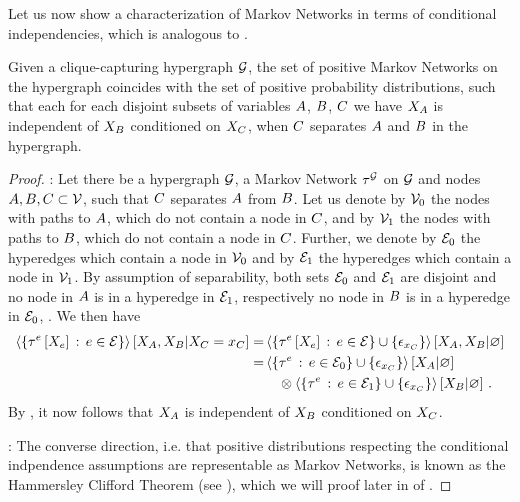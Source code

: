 Let us now show a characterization of Markov Networks in terms of conditional independencies, which is analogous to .

\begin{theorem}
    \label{the:condIndMN}
    Given a clique-capturing hypergraph $\mathcal{G}$, the set of positive Markov Networks on the hypergraph coincides with the set of positive probability distributions, such that each for each disjoint subsets of variables $A$, $B$, $C$ we have $X_{A}$ is independent of $X_{B}$ conditioned on $X_{C}$, when $C$ separates $A$ and $B$ in the hypergraph. %
\end{theorem}
\begin{proof}
    \proofrightsymbol:
    Let there be a hypergraph $\mathcal{G}$, a Markov Network $\tau^{\mathcal{G}}$ on $\mathcal{G}$ and nodes $A,B,C \subset \mathcal{V}$, such that $C$ separates $A$ from $B$.
    Let us denote by $\mathcal{V}_0$ the nodes with paths to $A$, which do not contain a node in $C$, and by $\mathcal{V}_1$ the nodes with paths to $B$, which do not contain a node in $C$.
    Further, we denote by $\mathcal{E}_0$ the hyperedges which contain a node in $\mathcal{V}_0$ and by $\mathcal{E}_1$ the hyperedges which contain a node in $\mathcal{V}_1$.
    By assumption of separability, both sets $\mathcal{E}_0$ and $\mathcal{E}_1$ are disjoint and no node in $A$ is in a hyperedge in $\mathcal{E}_1$, respectively no node in $B$ is in a hyperedge in $\mathcal{E}_0$, .
    We then have
    \begin{align*}
        \left\langle \left\{\tau^{e}\left[X_{e}\right]\, : \, e\in\mathcal{E}\right\}\right\rangle \left[ X_{A},X_{B} | X_{C}=x_{C} \right]
        = & \left\langle \left\{\tau^{e}\left[X_{e}\right]\, : \, e\in\mathcal{E}\right\}\cup\{\epsilon_{x_{C}}\}\right\rangle \left[ X_{A},X_{B} | \varnothing \right] \\
        = &  \left\langle \{\tau^{e}\,:\,e\in\mathcal{E}_0\}\cup\{\epsilon_{x_{C}}\}\right\rangle \left[ X_{A} | \varnothing \right] \\
        & \quad \otimes \left\langle \{\tau^{e}\,:\,e\in\mathcal{E}_1\}\cup\{\epsilon_{x_{C}}\}\right\rangle \left[ X_{B} | \varnothing \right] \, .
    \end{align*}
    By , it now follows that $X_{A}$ is independent of $X_{B}$ conditioned on $X_{C}$.

    \proofleftsymbol:
    The converse direction, i.e. that positive distributions respecting the conditional indpendence assumptions are representable as Markov Networks, is known as the Hammersley Clifford Theorem (see \cite{clifford_markov_1971}), which we will proof later in  of .
\end{proof}

